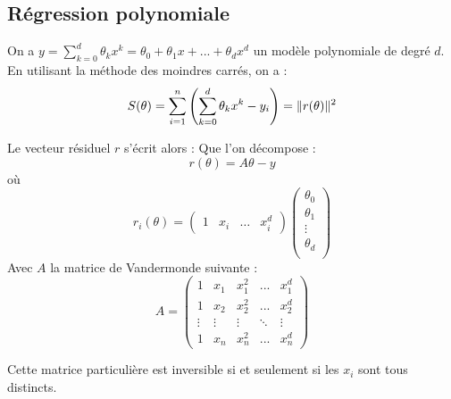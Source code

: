 

	\subsection{Régression polynomiale}
		On a $y = \sum_{k=0}^d \theta_k x^k = \theta_0 + \theta_1 x + ... + \theta_d x^d$ un modèle polynomiale de degré $d$. En utilisant la méthode des moindres carrés, on a :
		$$
			S(\theta) = \sum_{i=1}^n \left( \sum_{k=0}^d \theta_k x^k - y_i \right) = \lVert r(\theta) \rVert^2 
		$$

		Le vecteur résiduel $r$ s'écrit alors :
		Que l'on décompose :
		\begin{equation}
			\label{eq-5-rLSM}
			r(\theta) = A\theta - y
		\end{equation}
		où
		$$
			r_i(\theta) = \begin{pmatrix}
							1 & x_i & \ldots & x_i^d 
						\end{pmatrix}
						\begin{pmatrix}
							\theta_0 \\
							\theta_1 \\
							\vdots \\
							\theta_d \\
						\end{pmatrix}
		$$
		Avec $A$ la matrice de Vandermonde suivante :
		\begin{equation}
			\label{eq-5-matVandermonde}
			A = \begin{pmatrix}
					1	& x_1	& x_1^2 & ... & x_1^d \\
					1	& x_2	& x_2^2 & ... & x_2^d \\
					\vdots	& \vdots	& \vdots & \ddots & \vdots \\
					1	& x_n	& x_n^2 & ... & x_n^d
				\end{pmatrix}
		\end{equation}

		Cette matrice particulière est inversible si et seulement si les $x_i$ sont tous distincts.

